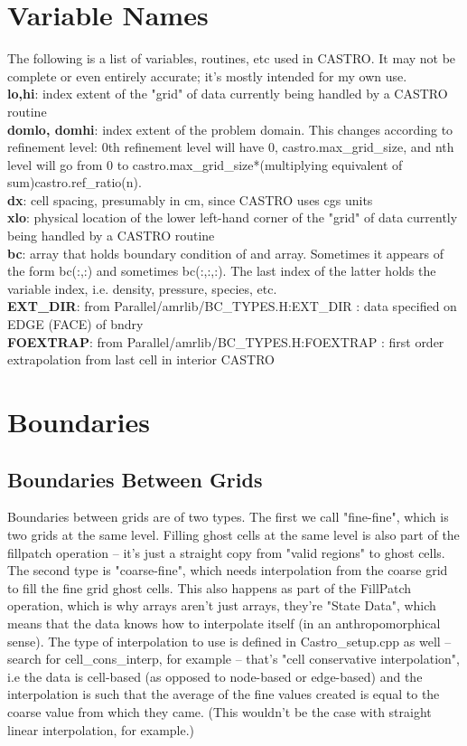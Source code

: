 \section{Variable Names}
The following is a list of variables, routines, etc used in CASTRO. It may not be complete or even entirely accurate; it's mostly intended for my own use.\\

{\bf lo,hi}: index extent of the "grid" of data currently being handled by a CASTRO routine\\

{\bf domlo, domhi}: index extent of the problem domain. This changes according to refinement level: 0th refinement level will have 0, castro.max\_grid\_size, and nth level will go from 0 to castro.max\_grid\_size*(multiplying equivalent of sum)castro.ref\_ratio(n).\\

{\bf dx}: cell spacing, presumably in cm, since CASTRO uses cgs units\\

{\bf xlo}: physical location of the lower left-hand corner of the "grid" of data currently being handled by a CASTRO routine\\

{\bf bc}: array that holds boundary condition of and array. Sometimes it appears of the form bc(:,:) and sometimes bc(:,:,:). The last index of the latter holds the variable index, i.e. density, pressure, species, etc.\\

{\bf EXT\_DIR}: from Parallel/amrlib/BC\_TYPES.H:EXT\_DIR  : data specified on EDGE (FACE) of bndry\\

{\bf FOEXTRAP}: from Parallel/amrlib/BC\_TYPES.H:FOEXTRAP  : first order extrapolation from last cell in interior CASTRO 

\section{Boundaries}
\subsection{Boundaries Between Grids}
Boundaries between grids are of two types. The first we call "fine-fine", which is two grids at the same level. 
Filling ghost cells at the same level is also part of the fillpatch operation -- it's just a straight copy from "valid regions" 
to ghost cells. The second type is "coarse-fine", which needs interpolation from the coarse grid to fill the fine grid ghost cells. 
This also happens as part of the FillPatch operation, which is why arrays aren't just arrays, they're "State Data", 
which means that the data knows how to interpolate itself (in an anthropomorphical sense). 
The type of interpolation to use is defined in Castro\_setup.cpp as well -- search for cell\_cons\_interp, for example -- 
that's "cell conservative interpolation", i.e the data is cell-based (as opposed to node-based or edge-based) and the 
interpolation is such that the average of the fine values created is equal to the coarse value from which they came. 
(This wouldn't be the case with straight linear interpolation, for example.) 

